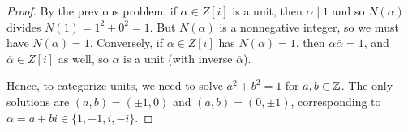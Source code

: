 \begin{proof}
    By the previous problem, if $\alpha \in Z[i]$ is a unit, then $\alpha \mid 1$ and so $N(\alpha)$ divides $N(1) = 1^2+0^2 = 1$. But $N(\alpha)$ is a nonnegative integer, so we must have $N(\alpha) = 1$. Conversely, if $\alpha \in Z[i]$ has $N(\alpha) = 1$, then $\alpha\overline{\alpha} = 1$, and $\overline{\alpha} \in Z[i]$ as well, so $\alpha$ is a unit (with inverse $\overline{\alpha}$).
    
    Hence, to categorize units, we need to solve $a^2+b^2 = 1$ for $a,b \in \mathbb{Z}$. The only solutions are $(a,b) = (\pm 1,0)$ and $(a,b) = (0,\pm 1)$, corresponding to $\alpha = a+bi \in \{1,-1,i,-i\}$.
\end{proof}